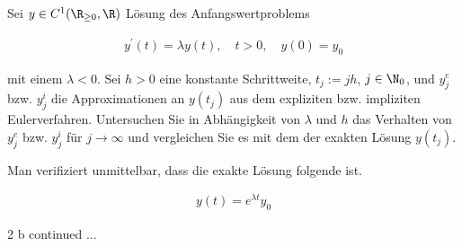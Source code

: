 \begin{exercise}

Sei $y \in C^1(\R_{\geq 0}, \R)$ Lösung des Anfangswertproblems

\begin{align*}
  y^\prime(t) = \lambda y(t),
  \quad
  t > 0,
  \quad
  y(0) = y_0
\end{align*}

mit einem $\lambda < 0$.
Sei $h > 0$ eine konstante Schrittweite, $t_j := jh$, $j \in \N_0$, und $y^e_j$ bzw. $y^i_j$ die Approximationen an $y(t_j)$ aus dem expliziten bzw. impliziten Eulerverfahren.
Untersuchen Sie in Abhängigkeit von $\lambda$ und $h$ das Verhalten von $y^e_j$ bzw. $y^i_j$ für $j \to \infty$ und vergleichen Sie es mit dem der exakten Lösung $y(t_j)$.

\end{exercise}

\begin{solution}

Man verifiziert unmittelbar, dass die exakte Lösung folgende ist.

\begin{align*}
  y(t) = e^{\lambda t} y_0
\end{align*}

2 b continued ...

\end{solution}
